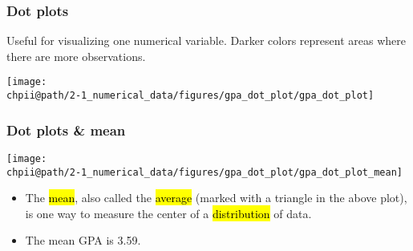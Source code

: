 \documentclass[slidestop,compress,mathserif]{beamer}
\makeatletter
\def\chpii@path{../../Chp 2}
\makeatother
\begin{document}

\begin{frame}
\frametitle{Dot plots}

Useful for visualizing one numerical variable. Darker colors represent areas where there are more observations.

\begin{center}
\texttt{[image: \\chpii@path/2-1\_numerical\_data/figures/gpa\_dot\_plot/gpa\_dot\_plot]}
\end{center}


\end{frame}



\begin{frame}
\frametitle{Dot plots \& mean}

\begin{center}
\texttt{[image: \\chpii@path/2-1\_numerical\_data/figures/gpa\_dot\_plot/gpa\_dot\_plot\_mean]}
\end{center}

\begin{itemize}

\item The \hl{mean}, also called the \hl{average} (marked with a triangle in the above plot), is one way to measure the center of a \hl{distribution} of data.

\item The mean GPA is 3.59.

\end{itemize} 

\end{frame}

\end{document}
